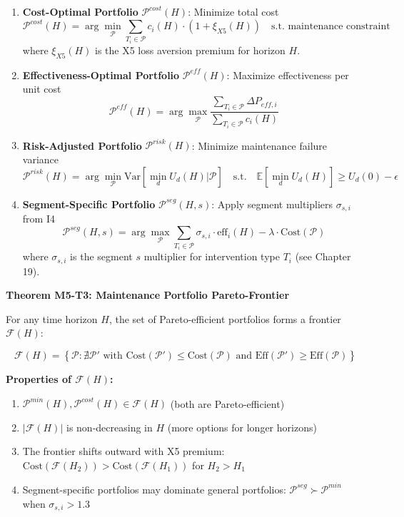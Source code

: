 \begin{tcolorbox}[colback=orange!5!white, colframe=orange!75!black,
    title=\textbf{Method UNTCM-M5: Maintenance Cost Analysis}]
\begin{enumerate}[nosep]
\item \textbf{Cost-Optimal Portfolio} $\mathcal{P}^{cost}(H)$: Minimize total cost
\[
\mathcal{P}^{cost}(H) = \arg\min_{\mathcal{P}} \sum_{T_i \in \mathcal{P}} c_i(H) \cdot (1 + \xi_{X5}(H)) \quad \text{s.t. maintenance constraint}
\]
where $\xi_{X5}(H)$ is the X5 loss aversion premium for horizon $H$.

\item \textbf{Effectiveness-Optimal Portfolio} $\mathcal{P}^{eff}(H)$: Maximize effectiveness per unit cost
\[
\mathcal{P}^{eff}(H) = \arg\max_{\mathcal{P}} \frac{\sum_{T_i \in \mathcal{P}} \Delta P_{eff,i}}{\sum_{T_i \in \mathcal{P}} c_i(H)}
\]

\item \textbf{Risk-Adjusted Portfolio} $\mathcal{P}^{risk}(H)$: Minimize maintenance failure variance
\[
\mathcal{P}^{risk}(H) = \arg\min_{\mathcal{P}} \text{Var}\left[\min_d U_d(H) | \mathcal{P}\right] \quad \text{s.t.} \quad \mathbb{E}\left[\min_d U_d(H)\right] \geq U_d(0) - \epsilon
\]

\item \textbf{Segment-Specific Portfolio} $\mathcal{P}^{seg}(H, s)$: Apply segment multipliers $\sigma_{s,i}$ from I4
\[
\mathcal{P}^{seg}(H, s) = \arg\max_{\mathcal{P}} \sum_{T_i \in \mathcal{P}} \sigma_{s,i} \cdot \text{eff}_i(H) - \lambda \cdot \text{Cost}(\mathcal{P})
\]
where $\sigma_{s,i}$ is the segment $s$ multiplier for intervention type $T_i$ (see Chapter 19).
\end{enumerate}

\vspace{0.5em}

\textbf{Theorem M5-T3: Maintenance Portfolio Pareto-Frontier}

For any time horizon $H$, the set of Pareto-efficient portfolios forms a frontier $\mathcal{F}(H)$:

\[
\mathcal{F}(H) = \left\{ \mathcal{P} : \nexists \mathcal{P}' \text{ with } \text{Cost}(\mathcal{P}') \leq \text{Cost}(\mathcal{P}) \text{ and } \text{Eff}(\mathcal{P}') \geq \text{Eff}(\mathcal{P}) \right\}
\]

\textbf{Properties of $\mathcal{F}(H)$:}
\begin{enumerate}[nosep]
\item $\mathcal{P}^{min}(H), \mathcal{P}^{cost}(H) \in \mathcal{F}(H)$ (both are Pareto-efficient)
\item $|\mathcal{F}(H)|$ is non-decreasing in $H$ (more options for longer horizons)
\item The frontier shifts outward with X5 premium: $\text{Cost}(\mathcal{F}(H_2)) > \text{Cost}(\mathcal{F}(H_1))$ for $H_2 > H_1$
\item Segment-specific portfolios may dominate general portfolios: $\mathcal{P}^{seg} \succ \mathcal{P}^{min}$ when $\sigma_{s,i} > 1.3$
\end{enumerate}


\end{tcolorbox}
